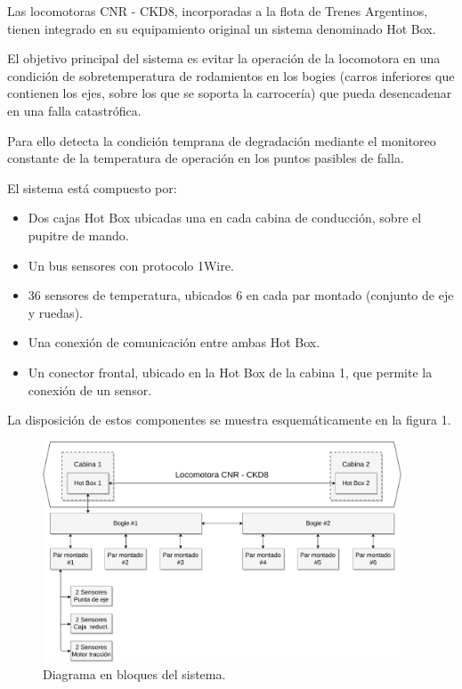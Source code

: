\documentclass[
11pt, %
codirector, %
]{charter}
\begin{document}
Las locomotoras CNR - CKD8, incorporadas a la flota de Trenes Argentinos, tienen integrado en su equipamiento original un sistema denominado Hot Box.

El objetivo principal del sistema es evitar la operación de la locomotora en una condición de sobretemperatura de rodamientos en los bogies (carros inferiores que contienen los ejes, sobre los que se soporta la carrocería) que pueda desencadenar en una falla catastrófica.

Para ello detecta la condición temprana de degradación mediante el monitoreo constante de la temperatura de operación en los puntos pasibles de falla.

El sistema está compuesto por:
\begin{itemize}
\item Dos cajas Hot Box ubicadas una en cada cabina de conducción, sobre el pupitre de mando. 
\item Un bus sensores con protocolo 1Wire.
\item 36 sensores de temperatura, ubicados 6 en cada par montado (conjunto de eje y ruedas).
\item Una conexión de comunicación entre ambas Hot Box.
\item Un conector frontal, ubicado en la Hot Box de la cabina 1, que permite la conexión de un sensor.
\end{itemize}
La disposición de estos componentes se muestra esquemáticamente en la figura 1.
\begin{figure}[h]
	\centering
	\includegraphics[angle=0,width=0.95\textwidth]{./Figuras/SMTB_bloques.pdf}
	\caption{Diagrama en bloques del sistema.}
	\label{fig:mesh1}
\end{figure}
\end{document}
